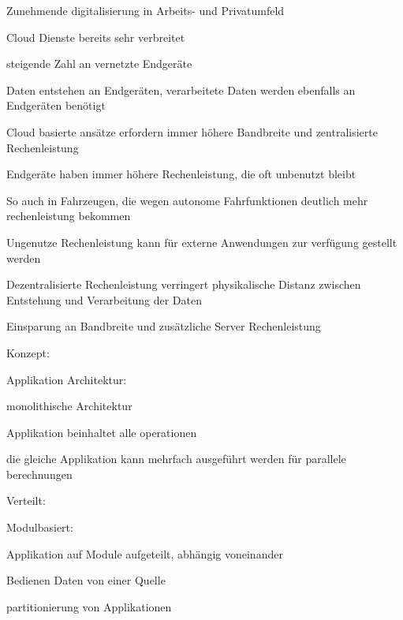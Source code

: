 \begin{notes}
\begin{notes}
        \item Zunehmende digitalisierung in Arbeits- und Privatumfeld
        \item Cloud Dienste bereits sehr verbreitet
        \item steigende Zahl an vernetzte Endgeräte
        \item Daten entstehen an Endgeräten, verarbeitete Daten werden ebenfalls an Endgeräten benötigt
        \item Cloud basierte ansätze erfordern immer höhere Bandbreite und zentralisierte Rechenleistung
        \item Endgeräte haben immer höhere Rechenleistung, die oft unbenutzt bleibt
        \item So auch in Fahrzeugen, die wegen autonome Fahrfunktionen deutlich mehr rechenleistung bekommen
        \item Ungenutze Rechenleistung kann für externe Anwendungen zur verfügung gestellt werden
        \item Dezentralisierte Rechenleistung verringert physikalische Distanz zwischen Entstehung und Verarbeitung der Daten
        \item Einsparung an Bandbreite und zusätzliche Server Rechenleistung
    \end{notes}

    \item Konzept: \cite{Mahmud2020}
    \begin{notes}
        \item Applikation Architektur:
        \begin{notes}
            \item monolithische Architektur
            \begin{notes}
                \item Applikation beinhaltet alle operationen
                \item die gleiche Applikation kann mehrfach ausgeführt werden für parallele berechnungen
            \end{notes}
            \item Verteilt:
            \begin{notes}
                \item Modulbasiert:

                    \item Applikation auf Module aufgeteilt, abhängig voneinander
                    \item Bedienen Daten von einer Quelle
                    \item partitionierung von Applikationen \cite{Ashraf2022}
 

\end{notes}
\end{notes}
\end{notes}
\end{notes}
